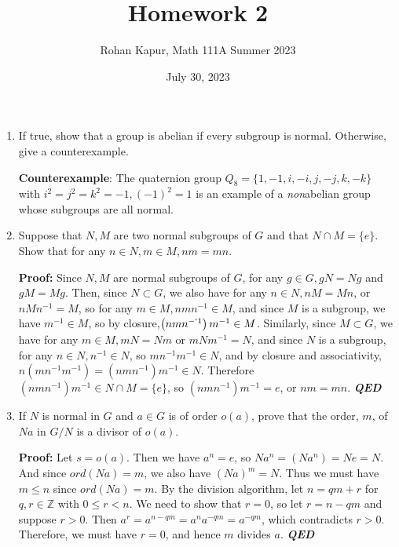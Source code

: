 \documentclass[11pt,twoside]{article}
\begin{document}
\title{Homework 2}
\date{July 30, 2023}
\author{Rohan Kapur, Math 111A Summer 2023}

\maketitle

\begin{enumerate}

	\item If true, show that a group is abelian if every subgroup is normal. Otherwise, give a counterexample.
	
	\textbf{Counterexample}: The quaternion group \( Q_8=\{1,-1,i,-i,j,-j,k,-k\}\) with \(i^2=j^2=k^2=-1,(-1)^2=1\) is an example of a \textit{non}abelian group whose subgroups are all normal.
 
	\item Suppose that \( N,M\) are two normal subgroups of \( G\) and that \( N\cap M = \{ e\}\). Show that for any \( n\in N, m\in M, nm = mn\).

	\textbf{Proof: }Since \( N,M\) are normal subgroups of \( G\), for any \( g\in G, gN = Ng\) and \( gM = Mg\). Then, since \( N\subset G\), we also have for any \( n\in N, nM = Mn\), or \( nMn^{-1} = M\), so for any \( m\in M, nmn^{-1}\in M\), and since \( M\) is a subgroup, we have \( m^{-1}\in M\), so by closure,\(\left(nmn^{-`1}\right)m^{-1}\in M\). Similarly, since \( M\subset G\), we have for any \( m\in M, mN = Nm\) or \( mNm^{-1} = N\), and since \( N\) is a subgroup, for any \( n\in N, n^{-1 }\in N\), so \( mn^{-1}m^{-1}\in N\), and by closure and associativity, \( n\left(mn^{-1}m^{-1}\right) =\left(nmn^{-1}\right)m^{-1}\in N\). Therefore \(\left(nmn^{-1}\right)m^{-1}\in N\cap M = \{ e\}\), so \(\left(nmn^{-1}\right)m^{-1} = e\), or \( nm = mn\). \textbf{\textit{QED}}

	\item If \( N\) is normal in \( G\) and \( a\in G\) is of order \( o(a)\), prove that the order, \( m\), of \( Na\) in \( G/N\) is a divisor of \( o(a)\).
	
	\textbf{Proof:} Let $ s = o(a) $. Then we have $ a^n  = e $, so $ Na^n = (Na^n) = Ne = N$. And since $ ord(Na) = m $, we also have $ (Na)^m = N $. Thus we must have $ m \le n $ since $ ord(Na) = m $. By the division algorithm, let $ n = qm + r $ for $q, r \in \mathbb{Z}$ with $0 \le r < n$. We need to show that $r=0$, so let $r = n-qm$ and suppose $r>0$. Then $a^r=a^{n-qm}=a^na^{-qm}=a^{-qm}$, which contradicts $r>0$. Therefore, we must have $r = 0$, and hence $m$ divides $a$. \textbf{\textit{QED}} 
	

\end{enumerate}
\end{document}
